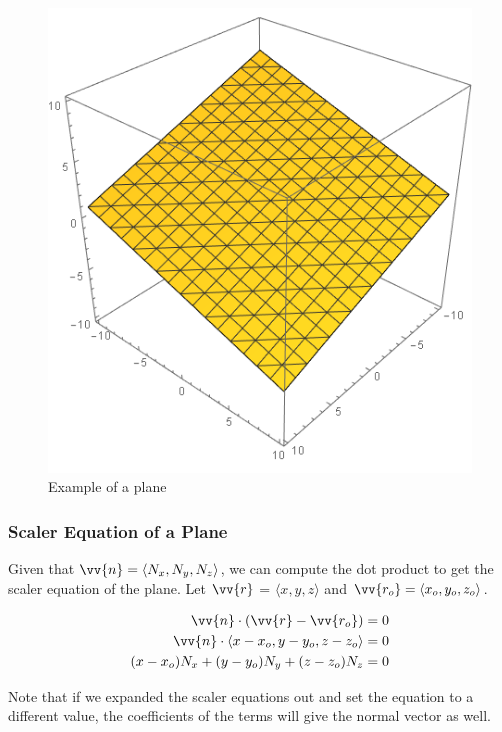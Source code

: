 \begin{figure}[H]
	\begin{center}
		\includegraphics[scale=0.45]{pages/images/plane.png}
		\caption{Example of a plane}	
		\label{fig:test_figure}
	\end{center}
\end{figure}


\subsubsection{Scaler Equation of a Plane}
Given that $\vv{n} = \langle N_x, N_y, N_z \rangle$, we can compute the dot product to get the scaler equation of the plane. Let $\vv{r}$ = $\langle x,y,z \rangle$ and $\vv{r_o} = \langle x_o,y_o,z_o \rangle$.

\begin{align*}
	\vv{n} \cdot (\vv{r} - \vv{r_o}) &= 0 \\ 
	\vv{n} \cdot \langle x-x_o,y-y_o, z-z_o  \rangle &= 0 \\ 
	(x-x_o)N_x + (y-y_o)N_y + (z-z_o)N_z &= 0 
\end{align*}

Note that if we expanded the scaler equations out and set the equation to a different value, the coefficients of the terms will give the normal vector as well. 

